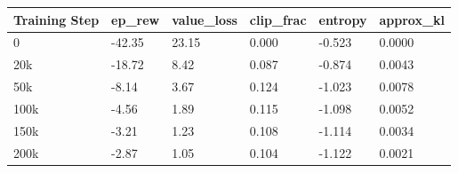 \begin{tabular}{llllll}
\toprule
Training Step & ep_rew & value_loss & clip_frac & entropy & approx_kl \\
\midrule
0 & -42.35 & 23.15 & 0.000 & -0.523 & 0.0000 \\
20k & -18.72 & 8.42 & 0.087 & -0.874 & 0.0043 \\
50k & -8.14 & 3.67 & 0.124 & -1.023 & 0.0078 \\
100k & -4.56 & 1.89 & 0.115 & -1.098 & 0.0052 \\
150k & -3.21 & 1.23 & 0.108 & -1.114 & 0.0034 \\
200k & -2.87 & 1.05 & 0.104 & -1.122 & 0.0021 \\
\bottomrule
\end{tabular}
